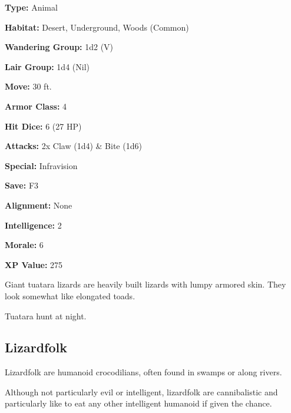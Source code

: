 \begin{multicols*}{2}
{\textbf{Type:} Animal

\textbf{Habitat:} Desert, Underground, Woods (Common)

\textbf{Wandering Group:} 1d2 (V)

\textbf{Lair Group:} 1d4 (Nil)

\textbf{Move:} 30 ft.

\textbf{Armor Class:} 4

\textbf{Hit Dice:} 6 (27 HP)

\textbf{Attacks:} 2x Claw (1d4) \& Bite (1d6)

\textbf{Special:} Infravision

\textbf{Save:} F3

\textbf{Alignment:} None

\textbf{Intelligence:} 2

\textbf{Morale:} 6

\textbf{XP Value:} 275}

Giant tuatara lizards are heavily built lizards with lumpy armored skin. They look somewhat like elongated toads.

Tuatara hunt at night.

\subsection{Lizardfolk}

Lizardfolk are humanoid crocodilians, often found in swamps or along rivers.

Although not particularly evil or intelligent, lizardfolk are cannibalistic and particularly like to eat any other intelligent humanoid if given the chance.


\end{multicols*}
